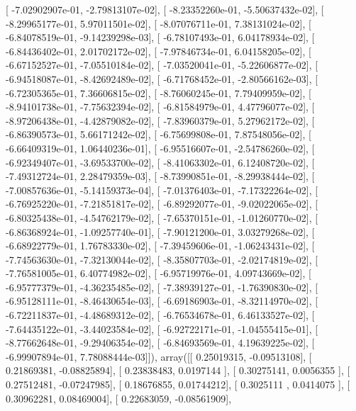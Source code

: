 \documentclass{article}
\begin{document}
       [ -7.02902907e-01,  -2.79813107e-02],
       [ -8.23352260e-01,  -5.50637432e-02],
       [ -8.29965177e-01,   5.97011501e-02],
       [ -8.07076711e-01,   7.38131024e-02],
       [ -6.84078519e-01,  -9.14239298e-03],
       [ -6.78107493e-01,   6.04178934e-02],
       [ -6.84436402e-01,   2.01702172e-02],
       [ -7.97846734e-01,   6.04158205e-02],
       [ -6.67152527e-01,  -7.05510184e-02],
       [ -7.03520041e-01,  -5.22606877e-02],
       [ -6.94518087e-01,  -8.42692489e-02],
       [ -6.71768452e-01,  -2.80566162e-03],
       [ -6.72305365e-01,   7.36606815e-02],
       [ -8.76060245e-01,   7.79409959e-02],
       [ -8.94101738e-01,  -7.75632394e-02],
       [ -6.81584979e-01,   4.47796077e-02],
       [ -8.97206438e-01,  -4.42879082e-02],
       [ -7.83960379e-01,   5.27962172e-02],
       [ -6.86390573e-01,   5.66171242e-02],
       [ -6.75699808e-01,   7.87548056e-02],
       [ -6.66409319e-01,   1.06440236e-01],
       [ -6.95516607e-01,  -2.54786260e-02],
       [ -6.92349407e-01,  -3.69533700e-02],
       [ -8.41063302e-01,   6.12408720e-02],
       [ -7.49312724e-01,   2.28479359e-03],
       [ -8.73990851e-01,  -8.29938444e-02],
       [ -7.00857636e-01,  -5.14159373e-04],
       [ -7.01376403e-01,  -7.17322264e-02],
       [ -6.76925220e-01,  -7.21851817e-02],
       [ -6.89292077e-01,  -9.02022065e-02],
       [ -6.80325438e-01,  -4.54762179e-02],
       [ -7.65370151e-01,  -1.01260770e-02],
       [ -6.86368924e-01,  -1.09257740e-01],
       [ -7.90121200e-01,   3.03279268e-02],
       [ -6.68922779e-01,   1.76783330e-02],
       [ -7.39459606e-01,  -1.06243431e-02],
       [ -7.74563630e-01,  -7.32130044e-02],
       [ -8.35807703e-01,  -2.02174819e-02],
       [ -7.76581005e-01,   6.40774982e-02],
       [ -6.95719976e-01,   4.09743669e-02],
       [ -6.95777379e-01,  -4.36235485e-02],
       [ -7.38939127e-01,  -1.76390830e-02],
       [ -6.95128111e-01,  -8.46430654e-03],
       [ -6.69186903e-01,  -8.32114970e-02],
       [ -6.72211837e-01,  -4.48689312e-02],
       [ -6.76534678e-01,   6.46133527e-02],
       [ -7.64435122e-01,  -3.44023584e-02],
       [ -6.92722171e-01,  -1.04555415e-01],
       [ -8.77662648e-01,  -9.29406354e-02],
       [ -6.84693569e-01,   4.19639225e-02],
       [ -6.99907894e-01,   7.78088444e-03]]), array([[ 0.25019315, -0.09513108],
       [ 0.21869381, -0.08825894],
       [ 0.23838483,  0.0197144 ],
       [ 0.30275141,  0.0056355 ],
       [ 0.27512481, -0.07247985],
       [ 0.18676855,  0.01744212],
       [ 0.3025111 ,  0.0414075 ],
       [ 0.30962281,  0.08469004],
       [ 0.22683059, -0.08561909],
\end{document}
